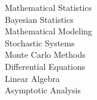 \documentclass[letterpaper]{deedy-resume} %
\begin{document}
\begin{minipage}[t]{0.33\textwidth}
        \textbullet{} Mathematical Statistics \\
        \textbullet{} Bayesian Statistics \\
        \textbullet{} Mathematical Modeling \\
        \textbullet{} Stochastic Systems \\
        \textbullet{} Monte Carlo Methods \\
        \textbullet{} Differential Equations \\
        \textbullet{} Linear Algebra \\
        \textbullet{} Asymptotic Analysis \\

    \sectionspace %



\end{minipage} %
\hfill
%
%
\end{document}
